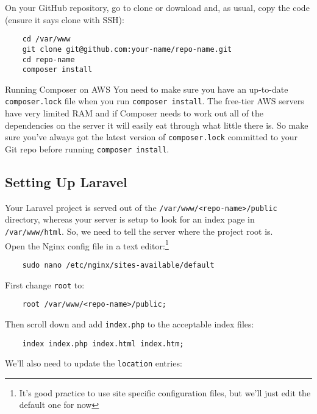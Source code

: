 On your GitHub repository, go to clone or download and, as usual, copy the code (ensure it says clone with SSH):

\begin{verbatim}
    cd /var/www
    git clone git@github.com:your-name/repo-name.git
    cd repo-name
    composer install
\end{verbatim}

\begin{infobox}{Running Composer on AWS}
    You need to make sure you have an up-to-date \texttt{composer.lock} file when you run \texttt{composer install}. The free-tier AWS servers have very limited RAM and if Composer needs to work out all of the dependencies on the server it will easily eat through what little there is. So make sure you've always got the latest version of \texttt{composer.lock} committed to your Git repo before running \texttt{composer install}.
\end{infobox}


\subsection{Setting Up Laravel}

Your Laravel project is served out of the \texttt{/var/www/<repo-name>/public} directory, whereas your server is setup to look for an index page in \texttt{/var/www/html}. So, we need to tell the server where the project root is.
\\

Open the Nginx config file in a text editor:\footnote{It's good practice to use site specific configuration files, but we'll just edit the default one for now}

\begin{verbatim}
    sudo nano /etc/nginx/sites-available/default
\end{verbatim}

First change \texttt{root} to:

\begin{verbatim}
    root /var/www/<repo-name>/public;
\end{verbatim}

Then scroll down and add \texttt{index.php} to the acceptable index files:

\begin{verbatim}
    index index.php index.html index.htm;
\end{verbatim}

We'll also need to update the \texttt{location} entries:

